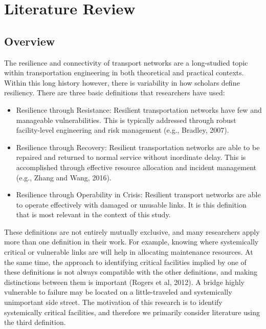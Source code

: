 \chapter{Literature Review}
\label{chp:chapter2}
\graphicspath{{figures/}{figures/chapter2/}}

\section{Overview}

The resilience and connectivity of transport networks are a long-studied topic within
transportation engineering in both theoretical and practical contexts. Within this long history
however, there is variability in how scholars define resiliency. There are three basic
definitions that researchers have used:

\begin{itemize}
	\item Resilience through Resistance: Resilient transportation networks have few and manageable vulnerabilities. This is typically addressed through robust facility-level engineering and risk management (e.g., Bradley, 2007).
	\item Resilience through Recovery: Resilient transportation networks are able to be repaired and returned to normal service without inordinate delay. This is accomplished through effective resource allocation and incident management (e.g., Zhang and Wang, 2016).
	\item Resilience through Operability in Crisis: Resilient transport networks are able to operate effectively with damaged or unusable links. It is this definition that is most relevant in the context of this study. 
\end{itemize}

These definitions are not entirely mutually exclusive, and many researchers apply more than one
definition in their work. For example, knowing where systemically critical or vulnerable links
are will help in allocating maintenance resources. At the same time, the approach to identifying
critical facilities implied by one of these definitions is not always compatible with the other
definitions, and making distinctions between them is important (Rogers et al, 2012). A bridge
highly vulnerable to failure may be located on a little-traveled and systemically unimportant
side street. The motivation of this research is to identify systemically critical facilities, and
therefore we primarily consider literature using the third definition.

